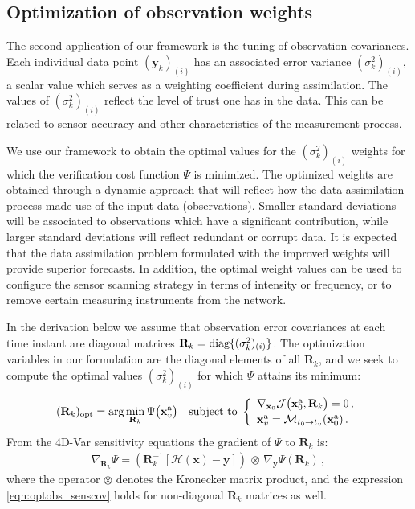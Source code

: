 \documentclass{article}
\newcommand{\Jfunc}{\mathcal J }
\newcommand{\Model}{\mathcal M}
\newcommand{\R}{\mathbf{R}}
\newcommand{\x}{   \mathbf{x} }
\newcommand{\xa}{ \mathbf{x}^{\rm a} }
\newcommand{\y}{ \mathbf{y} }
\renewcommand{\H}{\mathcal{H}}
\begin{document}
\subsection{Optimization of observation weights}\label{sec:optimize-weights}


The second application of our framework is the tuning of observation covariances.
Each individual data point $(\y_k)_{(i)}$ has an associated error variance $(\sigma^2_k)_{(i)}$, 
a scalar value which serves as a weighting coefficient during assimilation.
The values of $(\sigma^2_k)_{(i)}$ reflect the level of trust one has in the data.
This can be related to sensor accuracy and other characteristics of the measurement process.


We use our framework to obtain the optimal values for the $(\sigma^2_k)_{(i)}$ weights 
for which the verification cost function $\Psi$ is minimized.
The optimized weights are obtained through a dynamic approach that will reflect 
how the data assimilation process made use of the input data (observations).
Smaller standard deviations will be associated to observations which have a significant contribution,
while larger standard deviations will reflect redundant or corrupt data.
It is expected that the data assimilation problem formulated with the improved weights will provide superior forecasts.
In addition, the optimal weight values can be used
to configure the sensor scanning strategy in terms of intensity or frequency,
or to remove certain measuring instruments from the network.

In the derivation below we assume that observation error covariances at each time instant are 
diagonal matrices $\R_k = \textnormal{diag}\{(\sigma^2_k)_{(i)}\}$.
The optimization variables in our formulation are the diagonal elements of all $\R_k$, and 
we seek to compute the optimal values $(\sigma^2_k)_{(i)}$ for which $\Psi$ attains its minimum:
\begin{equation}
 \label{eqn:optimal-R}
 (\R_k)_\textrm{opt} = \arg\min_{\R_k} \Psi\bigl(\xa_v\bigr) \quad \textnormal{subject to }
 \left\{ 
 \begin{array}{l}
 \nabla_{\x_0} \Jfunc\bigl(\xa_0,\R_k\bigr) = 0\,, \\[2pt]
 \xa_v = \Model_{t_0 \rightarrow t_v} (\xa_0)\,.
 \end{array}
 \right. 
\end{equation}
From the 4D-Var sensitivity equations \cite{Daescu_2008} the gradient of $\Psi$ to $\R_k$ is:
\begin{align}
 \nabla_{\R_k} \Psi = \left( \R_k^{-1} \left[ \H(\x) - \y \right] \right) \, \otimes \, \nabla_\y \Psi(\R_k)\,,
 \label{eqn:optobs_senscov}
\end{align}
where the operator $\otimes$ denotes the Kronecker matrix product, and 
 the expression \eqref{eqn:optobs_senscov} holds for non-diagonal $\R_k$ matrices as well.
\end{document}
